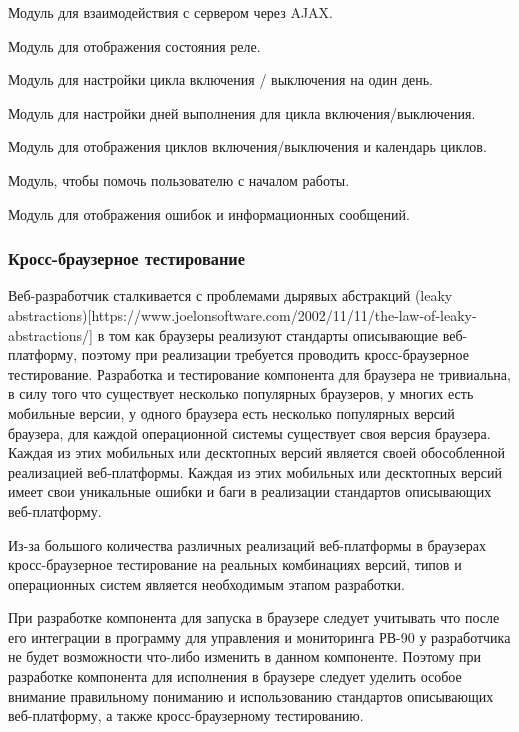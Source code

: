 \begin{my_itemize}
\item Модуль для взаимодействия с сервером через AJAX.
\item Модуль для отображения состояния реле.
\item Модуль для настройки цикла включения / выключения на один день.
\item Модуль для настройки дней выполнения для цикла включения/выключения.
\item Модуль для отображения циклов включения/выключения и календарь циклов.
\item Модуль, чтобы помочь пользователю с началом работы.
\item Модуль для отображения ошибок и информационных сообщений.
\end{my_itemize}

\subsubsection{ Кросс-браузерное тестирование}
Веб-разработчик сталкивается с проблемами дырявых абстракций (leaky abstractions)[https://www.joelonsoftware.com/2002/11/11/the-law-of-leaky-abstractions/] в том как браузеры реализуют стандарты описывающие веб-платформу, поэтому при реализации требуется проводить кросс-браузерное тестирование.
Разработка и тестирование компонента для браузера не тривиальна, в силу того что 
существует несколько популярных браузеров, у многих есть мобильные версии, у одного браузера есть несколько популярных версий браузера, для каждой операционной системы существует своя версия браузера. Каждая из этих мобильных или десктопных версий является своей обособленной реализацией веб-платформы. Каждая из этих мобильных или десктопных версий имеет свои уникальные ошибки и баги в реализации стандартов описывающих веб-платформу. 


Из-за большого количества различных реализаций веб-платформы в браузерах кросс-браузерное тестирование на реальных комбинациях версий, типов и операционных систем является необходимым этапом разработки.

При разработке компонента для запуска в браузере следует учитывать что после его интеграции в программу для управления и мониторинга РВ-90 у разработчика не будет возможности что-либо изменить в данном компоненте. Поэтому при разработке компонента для исполнения в браузере следует уделить особое внимание правильному пониманию и использованию стандартов описывающих веб-платформу, а также кросс-браузерному тестированию. 

